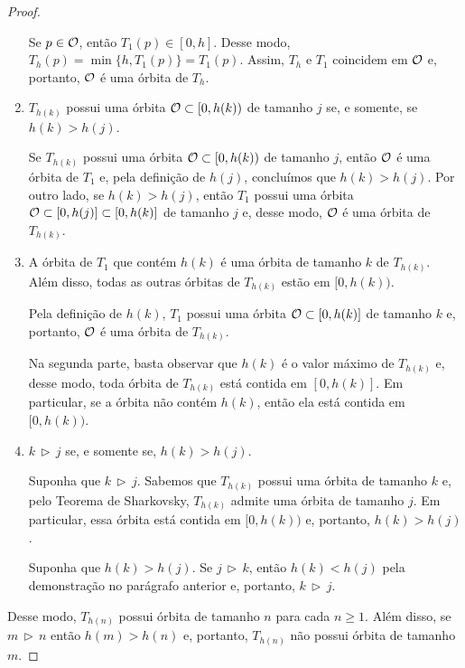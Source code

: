 \begin{proof}
\begin{enumerate}[label=\alph*)]
Se $p \in \mathcal{O}$, então $T_1(p) \in [0, h]$. Desse modo, $T_h(p) = \min \lbrace h, T_1(p) \rbrace = T_1(p)$.
Assim, $T_h$ e $T_1$ coincidem em $\mathcal{O}$ e, portanto, $\mathcal{O}$ é uma órbita de $T_h$.

\item $T_{h(k)}$ possui uma órbita $\mathcal{O} \subset [0, h(k))$ de tamanho $j$ se, e somente, se $h(k) > h(j)$.

Se $T_{h(k)}$ possui uma órbita $\mathcal{O} \subset [0, h(k))$ de tamanho $j$, então $\mathcal{O}$ é uma órbita de $T_1$ e, pela definição de $h(j)$, concluímos que $h(k) > h(j)$.
Por outro lado, se $h(k) > h(j)$, então $T_1$ possui uma órbita $\mathcal{O} \subset [0, h(j)] \subset [0, h(k)]$ de tamanho $j$ e, desse modo, $\mathcal{O}$ é uma órbita de $T_{h(k)}$.

\item A órbita de $T_1$ que contém $h(k)$ é uma órbita de tamanho $k$ de $T_{h(k)}$.
Além disso, todas as outras órbitas de $T_{h(k)}$ estão em $[0, h(k))$. 

Pela definição de $h(k)$, $T_1$ possui uma órbita $\mathcal{O} \subset [0, h(k)]$ de tamanho $k$ e, portanto, $\mathcal{O}$ é uma órbita de $T_{h(k)}$.

Na segunda parte, basta observar que $h(k)$ é o valor máximo de $T_{h(k)}$ e, desse modo, toda órbita de $T_{h(k)}$ está contida em $[0, h(k)]$.
Em particular, se a órbita não contém $h(k)$, então ela está contida em $[0, h(k))$.

\item $k \, \triangleright \, j$ se, e somente se, $h(k) > h(j)$.

Suponha que $k \, \triangleright \, j$. Sabemos que $T_{h(k)}$ possui uma órbita de tamanho $k$ e, pelo Teorema de Sharkovsky, $T_{h(k)}$ admite uma órbita de tamanho $j$. Em particular, essa órbita está contida em $[0, h(k))$ e, portanto, $h(k) > h(j)$.

Suponha que $h(k) > h(j)$. Se $j \, \triangleright \, k$, então $h(k) < h(j)$ pela demonstração no parágrafo anterior e, portanto, $k \, \triangleright \, j$.
\end{enumerate}

Desse modo, $T_{h(n)}$ possui órbita de tamanho $n$ para cada $n \geq 1$. Além disso, se $m \, \triangleright \, n$ então $h(m) > h(n)$ e, portanto, $T_{h(n)}$ não possui órbita de tamanho $m$.
\end{proof}
